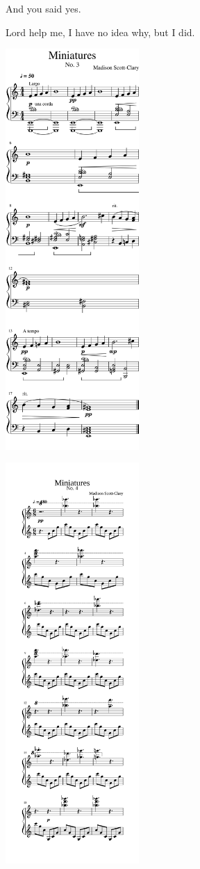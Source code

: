 \begin{paracol}{2}
\begin{leftcolumn}
\begin{ally}
And you said yes.
\end{ally}
Lord help me, I have no idea why, but I did.
\newpage
\end{leftcolumn}
\begin{rightcolumn*}
\noindent\includegraphics[width=2in]{assets/static/miniatures/3-1.png}

\noindent\includegraphics[width=2in]{assets/static/miniatures/4-1.png}


\end{rightcolumn*}
\end{paracol}
